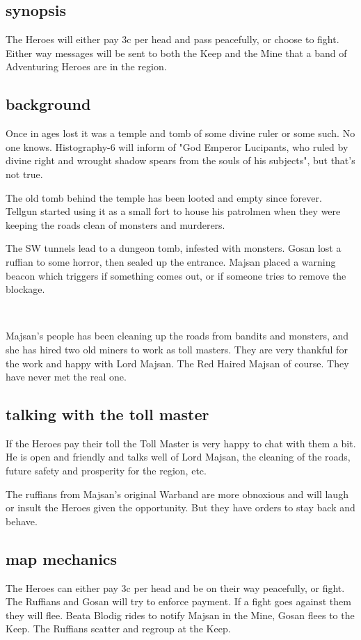 \subsection*{synopsis}
The Heroes will either pay 3c per head and pass peacefully, or choose to fight. Either way messages will be sent to both the Keep and the Mine that a band of Adventuring Heroes are in the region.


\subsection*{background}
Once in ages lost it was a temple and tomb of some divine ruler or some such. No one knows. Histography-6 will inform of "God Emperor Lucipants, who ruled by divine right and wrought shadow spears from the souls of his subjects", but that's not true.

The old tomb behind the temple has been looted and empty since forever. Tellgun started using it as a small fort to house his patrolmen when they were keeping the roads clean of monsters and murderers.

The SW tunnels lead to a dungeon tomb, infested with monsters. Gosan lost a ruffian to some horror, then sealed up the entrance. Majsan placed a warning beacon which triggers if something comes out, or if someone tries to remove the blockage.

\

Majsan's people has been cleaning up the roads from bandits and monsters, and she has hired two old miners to work as toll masters. They are very thankful for the work and happy with Lord Majsan. The Red Haired Majsan of course. They have never met the real one.


\subsection*{talking with the toll master}
If the Heroes pay their toll the Toll Master is very happy to chat with them a bit. He is open and friendly and talks well of Lord Majsan, the cleaning of the roads, future safety and prosperity for the region, etc.

The ruffians from Majsan's original Warband are more obnoxious and will laugh or insult the Heroes given the opportunity. But they have orders to stay back and behave.


\subsection*{map mechanics}
The Heroes can either pay 3c per head and be on their way peacefully, or fight. The Ruffians and Gosan will try to enforce payment. If a fight goes against them they will flee. Beata Blodig rides to notify Majsan in the Mine, Gosan flees to the Keep. The Ruffians scatter and regroup at the Keep.

